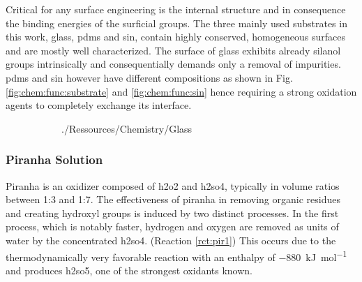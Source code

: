 Critical for any surface engineering is the internal structure and in consequence the binding energies of the surficial groups. The three mainly used substrates in this work, glass, \gls{pdms} and \gls{sin}, contain highly conserved, homogeneous surfaces and are mostly well characterized. The surface of glass exhibits already \gls{silanol} groups intrinsically and consequentially demands only a removal of impurities. \gls{pdms} and \gls{sin} however have different compositions as shown in Fig. \ref{fig:chem:func:substrate} and \ref{fig:chem:func:sin} hence requiring a strong oxidation agents to completely exchange its interface.  \cite{lit:chem:binding:sin, lit:chem:binding:pdms,lit:chem:surface:pdms}


\begin{figure}[h!]
	\begin{subfigure}[b]{0.30\textwidth}
		\centering
		\addtocounter{subfigure}{1}  
		 {./Ressources/Chemistry/Glass}		
		\addtocounter{subfigure}{-1}  
		\label{fig:chem:func:glass}
	\end{subfigure}%
	\hfill
	\begin{subfigure}[b]{0.69\textwidth}
		\centering
		\addtocounter{subfigure}{1}  
		\addtocounter{subfigure}{-1}  
		\label{fig:chem:func:pdms}
	\end{subfigure}
\end{figure}

\subsubsection{Piranha Solution}
Piranha is an oxidizer composed of \gls{h2o2} and \gls{h2so4}, typically in volume ratios between 1:3 and 1:7. The effectiveness of piranha in removing organic residues and creating \gls{hydroxyl} groups is induced by two distinct processes. In the first process, which is notably faster, hydrogen and oxygen are removed as units of water by the concentrated \gls{h2so4}.  (Reaction \ref{rct:pir1}) This occurs due to the thermodynamically very favorable reaction with an enthalpy of \SI{-880}{\kilo\joule\per\mole} and produces \gls{h2so5}, one of the strongest oxidants known.  \cite{lit:chem:piranha}

